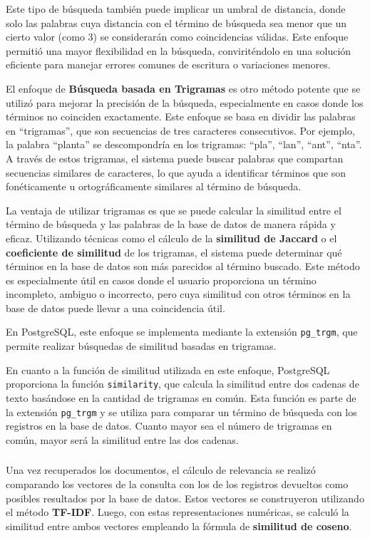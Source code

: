 Este tipo de búsqueda también puede implicar un umbral de distancia, donde solo las palabras cuya distancia con el término de búsqueda sea menor que un cierto valor 
(como 3) se considerarán como coincidencias válidas. Este enfoque permitió una mayor flexibilidad en la búsqueda, conviriténdolo en una solución eficiente para 
manejar errores comunes de escritura o variaciones menores.

El enfoque de \textbf{Búsqueda basada en Trigramas} es otro método potente que se utilizó para mejorar la precisión de la búsqueda, especialmente en casos donde los términos no coinciden exactamente. 
Este enfoque se basa en dividir las palabras en ``trigramas'', que son secuencias de tres caracteres consecutivos. Por ejemplo, la palabra ``planta'' se 
descompondría en los trigramas: ``pla'', ``lan'', ``ant'', ``nta''. A través de estos trigramas, el sistema puede buscar palabras que compartan secuencias similares de caracteres, 
lo que ayuda a identificar términos que son fonéticamente u ortográficamente similares al término de búsqueda.

La ventaja de utilizar trigramas es que se puede calcular la similitud entre el término de búsqueda y las palabras de la base de datos de manera rápida y eficaz. Utilizando 
técnicas como el cálculo de la \textbf{similitud de Jaccard} o el \textbf{coeficiente de similitud} de los trigramas, el sistema puede determinar qué términos en la base de datos 
son más parecidos al término buscado. Este método es especialmente útil en casos donde el usuario proporciona un término incompleto, ambiguo o incorrecto, pero cuya similitud con otros términos en la base de datos 
puede llevar a una coincidencia útil.

En PostgreSQL, este enfoque se implementa mediante la extensión \texttt{pg\_trgm}, que permite realizar búsquedas de similitud basadas en trigramas. 

En cuanto a la función de similitud utilizada en este enfoque, PostgreSQL proporciona la función \texttt{similarity}, que calcula la similitud entre dos cadenas de texto basándose en la cantidad de trigramas en común. 
Esta función es parte de la extensión \texttt{pg\_trgm} y se utiliza para comparar un término de búsqueda con los registros en la base de datos. Cuanto mayor sea el número de trigramas en común, mayor será la similitud entre las dos cadenas.

\subsubsection*{}
Una vez recuperados los documentos, el cálculo de relevancia se realizó comparando los vectores de la consulta con los de los registros devueltos como posibles resultados por la base de datos. Estos vectores se construyeron utilizando el método \textbf{TF-IDF}. Luego, con estas representaciones 
numéricas, se calculó la similitud entre ambos vectores empleando la fórmula de \textbf{similitud de coseno}. 

